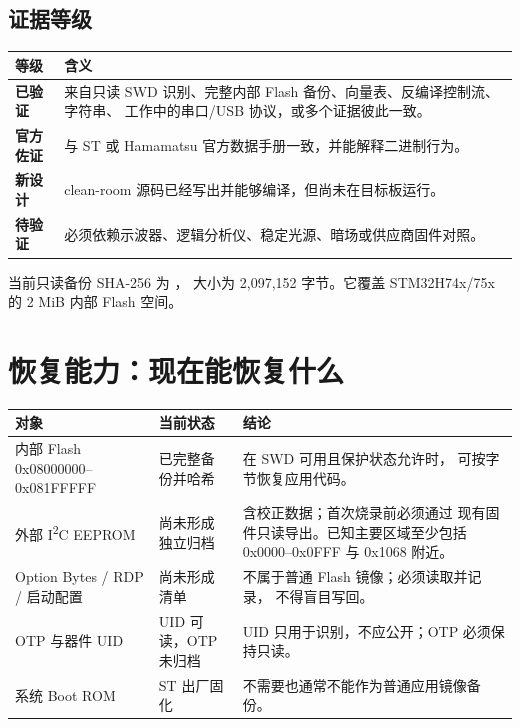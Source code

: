 \documentclass[UTF8,fontset=windows,11pt]{ctexart}
\begin{document}
\subsection{证据等级}

\begin{longtable}{>{\bfseries}p{}p{}}
\toprule
等级 & 含义\\
\midrule
\endhead
已验证 & 来自只读 SWD 识别、完整内部 Flash 备份、向量表、反编译控制流、字符串、
工作中的串口/USB 协议，或多个证据彼此一致。\\
官方佐证 & 与 ST 或 Hamamatsu 官方数据手册一致，并能解释二进制行为。\\
新设计 & clean-room 源码已经写出并能够编译，但尚未在目标板运行。\\
待验证 & 必须依赖示波器、逻辑分析仪、稳定光源、暗场或供应商固件对照。\\
\bottomrule
\end{longtable}

\begin{verifiedbox}
当前只读备份 SHA-256 为
\texttt{}，
大小为 2,097,152 字节。它覆盖 STM32H74x/75x 的 2 MiB 内部 Flash 空间。
\end{verifiedbox}

\section{恢复能力：现在能恢复什么}

\begin{longtable}{p{}p{}p{}}
\toprule
对象 & 当前状态 & 结论\\
\midrule
\endhead
内部 Flash 0x08000000--0x081FFFFF & 已完整备份并哈希 & 在 SWD 可用且保护状态允许时，
可按字节恢复应用代码。\\
外部 I\textsuperscript{2}C EEPROM & 尚未形成独立归档 & 含校正数据；首次烧录前必须通过
现有固件只读导出。已知主要区域至少包括 0x0000--0x0FFF 与 0x1068 附近。\\
Option Bytes / RDP / 启动配置 & 尚未形成清单 & 不属于普通 Flash 镜像；必须读取并记录，
不得盲目写回。\\
OTP 与器件 UID & UID 可读，OTP 未归档 & UID 只用于识别，不应公开；OTP 必须保持只读。\\
系统 Boot ROM & ST 出厂固化 & 不需要也通常不能作为普通应用镜像备份。\\
\bottomrule
\end{longtable}
\end{document}
